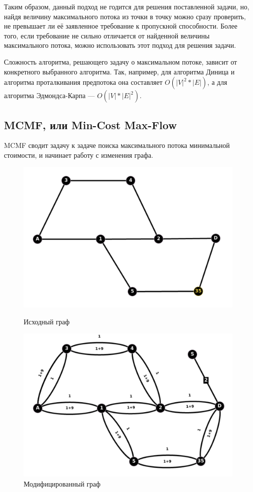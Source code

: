 \documentclass[a4paper]{article}
\begin{document}
Таким образом, данный подход не годится для решения поставленной задачи, но, найдя величину максимального потока из точки в точку можно сразу проверить, не превышает ли её заявленное требование к пропускной способности. Более того, если требование не сильно отличается от найденной величины максимального потока, можно использовать этот подход для решения задачи.

Сложность алгоритма, решающего задачу о максимальном потоке, зависит от конкретного выбранного алгоритма. Так, например, для алгоритма Диница \cite{diniz} и алгоритма проталкивания предпотока \cite{prepush} она составляет $O(|V|^2*|E|)$, а для алгоритма Эдмондса-Карпа \cite{edmkarp} --- $O(|V|*|E|^2)$.

\subsection{MCMF, или Min-Cost Max-Flow}
MCMF\cite{stepsmel} сводит задачу к задаче поиска максимального потока минимальной стоимости, и начинает работу с изменения графа.

\begin{figure}[!htb]
   \begin{minipage}{0.5\textwidth}
     \centering
     \includegraphics[width=.9\linewidth]{mc_bf.png}
     \caption{Исходный граф}\label{Fig:mc_bf}
   \end{minipage}
   \begin{minipage}{0.5\textwidth}
     \centering
     \includegraphics[width=.9\linewidth]{mc_af.png}
     \caption{Модифицированный граф}\label{Fig:mc_af}
   \end{minipage}\hfill
\end{figure}
\end{document}
